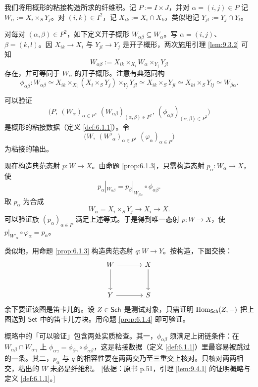 \begin{proofsketch}
我们将用概形的粘接构造所求的纤维积。记 $P := I \times J$，并对 $\alpha = (i,j) \in P$ 记 $W_\alpha := X_i \times_S Y_j$。对 $(i,k) \in I^2$，记 $X_{ik} := X_i \cap X_k$，类似地记 $Y_{jl} := Y_j \cap Y_l$。

对每对 $(\alpha,\beta) \in P^2$，如下定义开子概形 $W_{\alpha\beta} \subseteq W_\alpha$。写 $\alpha = (i,j)$、$\beta = (k,l)$。因 $X_{ik} \to X_i$ 与 $Y_{jl} \to Y_j$ 是开子概形，两次施用引理 \ref{lem:9.3.2} 可知
\[
W_{\alpha\beta} := X_{ik} \times_{X_i} W_\alpha \times_{Y_j} Y_{jl}
\]
存在，并可等同于 $W_\alpha$ 的开子概形。注意有典范同构
\[
\phi_{\alpha\beta} \colon W_{\alpha\beta} \simeq X_{ik} \times_{X_i} (X_i \times_S Y_j) \times_{Y_j} Y_{jl} \simeq X_{ik} \times_S Y_{jl} \simeq X_{ki} \times_S Y_{lj} \simeq W_{\beta\alpha}.
\]

可以验证
\[
\bigl(P,\ (W_\alpha)_{\alpha \in P},\ (W_{\alpha\beta})_{(\alpha,\beta) \in P^2},\ (\phi_{\alpha\beta})_{(\alpha,\beta) \in P^2}\bigr)
\]
是概形的粘接数据（定义 \ref{def:6.1.1}）。令
\[
\bigl(W,\ (W'_\alpha)_{\alpha \in P},\ (\varphi_\alpha)_{\alpha \in P}\bigr)
\]
为粘接的输出。

现在构造典范态射 $p \colon W \to X$。由命题 \ref{prop:6.1.3}，只需构造态射 $p_\alpha \colon W_\alpha \to X$，使
\[
p_\alpha|_{W_{\alpha\beta}} = p_\beta|_{W_{\beta\alpha}} \circ \phi_{\alpha\beta}.
\]
取 $p_\alpha$ 为合成
\[
W_\alpha = X_i \times_S Y_j \longrightarrow X_i \longrightarrow X .
\]
可以验证族 $(p_\alpha)_{\alpha \in P}$ 满足上述等式。于是得到唯一态射 $p \colon W \to X$，使 $p|_{W'_\alpha} \circ \varphi_\alpha = p_\alpha$。

类似地，用命题 \ref{prop:6.1.3} 构造典范态射 $q \colon W \to Y$。按构造，下图交换：
\[
\begin{tikzcd}[column sep=3.6em,row sep=3em]
W \arrow[r] \arrow[d] & X \arrow[d]\\
Y \arrow[r] & S
\end{tikzcd}
\]
余下要证该图是笛卡儿的。设 $Z \in \mathsf{Sch}$ 是测试对象，只需证明 $\operatorname{Hom}_{\mathsf{Sch}}(Z,-)$ 把上图送到 $\mathsf{Set}$ 中的笛卡儿方块。用命题 \ref{prop:6.1.4} 即可验证。
\end{proofsketch}

\begin{yizhu}
概略中的「可以验证」包含两处实质检查。其一，$\phi_{\alpha\beta}$ 须满足上闭链条件：在 $W_{\alpha\beta} \cap W_{\alpha\gamma}$ 上 $\phi_{\alpha\gamma} = \phi_{\beta\gamma} \circ \phi_{\alpha\beta}$，这是粘接数据（定义 \ref{def:6.1.1}）里最容易被跳过的一条。其二，$p_\alpha$ 与 $q$ 的相容性要在两两交乃至三重交上核对。只核对两两相交，粘出的 $W$ 未必是纤维积。
[依据：原书 p.51，引理 \ref{lem:9.4.1} 的证明概略与定义 \ref{def:6.1.1}。]
\end{yizhu}
